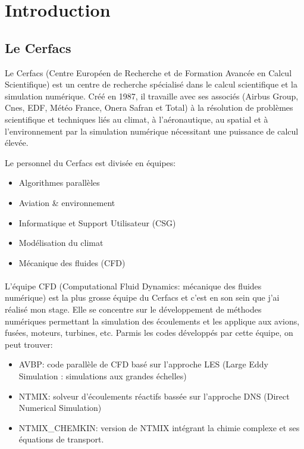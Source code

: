 \section*{Introduction}
\subsection*{Le Cerfacs}\label{sec:intro}

Le Cerfacs (Centre Européen de Recherche et de Formation Avancée en Calcul Scientifique) est un centre de recherche spécialisé dans le calcul scientifique et la simulation numérique. Créé en 1987, il travaille avec ses associés (Airbus Group, Cnes, EDF, Météo France, Onera Safran et Total) à la résolution de problèmes scientifique et techniques liés au climat, à l'aéronautique, au spatial et à l'environnement par la simulation numérique nécessitant une puissance de calcul élevée.


Le personnel du Cerfacs est divisée en équipes:
\begin{itemize}
\item Algorithmes parallèles
\item Aviation \& environnement
\item Informatique et Support Utilisateur (CSG)
\item Modélisation du climat
\item Mécanique des fluides (CFD)
\end{itemize}

\paragraph{}L'équipe CFD (Computational Fluid Dynamics: mécanique des fluides numérique) est la plus grosse équipe du Cerfacs et c'est en son sein que j'ai réalisé mon stage. Elle se concentre sur le développement de méthodes numériques permettant la simulation des écoulements et les applique aux avions, fusées, moteurs, turbines, etc. Parmis les codes développés par cette équipe, on peut trouver\cite{cerfacs}:
\begin{itemize}
\item AVBP: code parallèle de CFD basé sur l'approche LES (Large Eddy Simulation : simulations aux grandes échelles)
\item NTMIX: solveur d'écoulements réactifs bassée sur l'approche DNS (Direct Numerical Simulation)
\item NTMIX\_CHEMKIN: version de NTMIX intégrant la chimie complexe et ses équations de transport.
\end{itemize}


